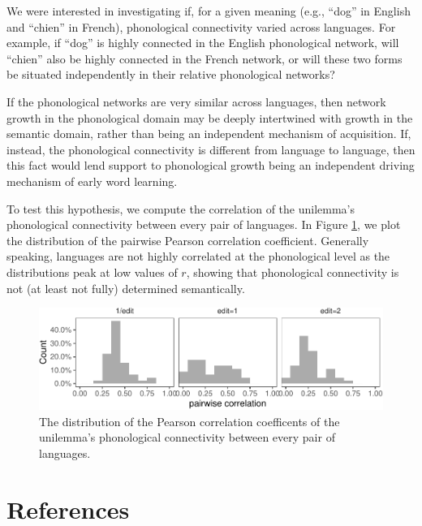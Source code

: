 \documentclass[english,,man,floatsintext]{apa6}
\begin{document}
We were interested in investigating if, for a given meaning (e.g., \enquote{dog} in English and \enquote{chien} in French), phonological connectivity varied across languages. For example, if \enquote{dog} is highly connected in the English phonological network, will \enquote{chien} also be highly connected in the French network, or will these two forms be situated independently in their relative phonological networks?

If the phonological networks are very similar across languages, then network growth in the phonological domain may be deeply intertwined with growth in the semantic domain, rather than being an independent mechanism of acquisition. If, instead, the phonological connectivity is different from language to language, then this fact would lend support to phonological growth being an independent driving mechanism of early word learning.

To test this hypothesis, we compute the correlation of the unilemma's phonological connectivity between every pair of languages. In Figure \ref{fig:corrPair}, we plot the distribution of the pairwise Pearson correlation coefficient. Generally speaking, languages are not highly correlated at the phonological level as the distributions peak at low values of \(r\), showing that phonological connectivity is not (at least not fully) determined semantically.

\begin{figure}[!h]
\includegraphics[width=\textwidth]{ms_files/figure-latex/corrPair-1} \caption{The distribution of the Pearson correlation coefficents of the unilemma's phonological connectivity between every pair of languages.}\label{fig:corrPair}
\end{figure}

\newpage

\hypertarget{references}{%
\section{References}\label{references}}

\setlength{\parindent}{-0.5in}
\setlength{\leftskip}{0.5in}
\end{document}
